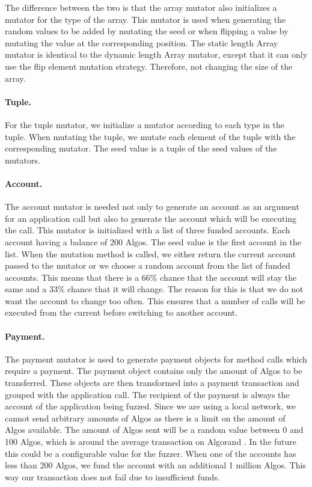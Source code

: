 The difference between the two is that the array mutator also initializes a mutator for the type of the array.
This mutator is used when generating the random values to be added by mutating the seed or when flipping a value by mutating the value at the corresponding position.
The static length Array mutator is identical to the dynamic length Array mutator, except that it can only use the flip element mutation strategy.
Therefore, not changing the size of the array.

\paragraph{Tuple.}
For the tuple mutator, we initialize a mutator according to each type in the tuple.
When mutating the tuple, we mutate each element of the tuple with the corresponding mutator.
The seed value is a tuple of the seed values of the mutators.

\paragraph{Account.}
The account mutator is needed not only to generate an account as an argument for an application call but also to generate the account which will be executing the call.
This mutator is initialized with a list of three funded accounts.
Each account having a balance of 200 Algos.
The seed value is the first account in the list.
When the mutation method is called, we either return the current account passed to the mutator or we choose a random account from the list of funded accounts.
This means that there is a 66\% chance that the account will stay the same and a 33\% chance that it will change.
The reason for this is that we do not want the account to change too often.
This ensures that a number of calls will be executed from the current before switching to another account.

\paragraph{Payment.}
The payment mutator is used to generate payment objects for method calls which require a payment.
The payment object contains only the amount of Algos to be transferred.
These objects are then transformed into a payment transaction and grouped with the application call.
The recipient of the payment is always the account of the application being fuzzed.
Since we are using a local network, we cannot send arbitrary amounts of Algos as there is a limit on the amount of Algos available.
The amount of Algos sent will be a random value between 0 and 100 Algos, which is around the average transaction on Algorand \cite{noauthor_algorand_nodate}.
In the future this could be a configurable value for the fuzzer.
When one of the accounts has less than 200 Algos, we fund the account with an additional 1 million Algos.
This way our transaction does not fail due to insufficient funds.


